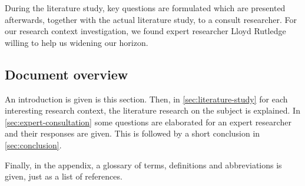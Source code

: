 During the literature study, key questions are formulated which are presented afterwards, together with the actual literature study, to a consult researcher.
For our research context investigation, we found expert researcher Lloyd Rutledge willing to help us widening our horizon.


\subsection{Document overview}
An introduction is given is this section.
Then, in \autoref{sec:literature-study} for each interesting research context, the literature research on the subject is explained.
In \autoref{sec:expert-consultation} some questions are elaborated for an expert researcher and their responses are given.
This is followed by a short conclusion in \autoref{sec:conclusion}.

Finally, in the appendix, a glossary of terms, definitions and abbreviations is given, just as a list of references.
